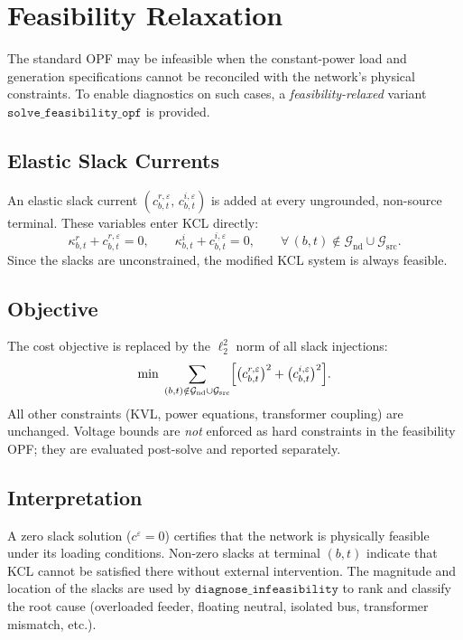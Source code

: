 \documentclass[11pt,a4paper]{article}
\newcommand{\mc}[1]{\mathcal{#1}}
\begin{document}
\section{Feasibility Relaxation}
\label{sec:feasibility}

The standard OPF may be infeasible when the constant-power load and generation
specifications cannot be reconciled with the network's physical constraints.  To
enable diagnostics on such cases, a \emph{feasibility-relaxed} variant
$\texttt{solve\_feasibility\_opf}$ is provided.

\subsection{Elastic Slack Currents}

An elastic slack current $(c^{r,\varepsilon}_{b,t},\, c^{i,\varepsilon}_{b,t})$
is added at every ungrounded, non-source terminal.  These variables enter KCL
directly:
%
\begin{equation}
  \kappa^r_{b,t} + c^{r,\varepsilon}_{b,t} = 0,\qquad
  \kappa^i_{b,t} + c^{i,\varepsilon}_{b,t} = 0,
  \qquad \forall\,(b,t)\notin\mc{G}_\text{nd}\cup\mc{G}_\text{src}.
\end{equation}
%
Since the slacks are unconstrained, the modified KCL system is always feasible.

\subsection{Objective}

The cost objective is replaced by the $\ell_2^2$ norm of all slack injections:
%
\begin{equation}
  \min\;\sum_{(b,t)\notin\mc{G}_\text{nd}\cup\mc{G}_\text{src}}
    \Bigl[
      \bigl(c^{r,\varepsilon}_{b,t}\bigr)^2
      + \bigl(c^{i,\varepsilon}_{b,t}\bigr)^2
    \Bigr].
\end{equation}
%
All other constraints (KVL, power equations, transformer coupling) are
unchanged.  Voltage bounds are \emph{not} enforced as hard constraints in the
feasibility OPF; they are evaluated post-solve and reported separately.

\subsection{Interpretation}

A zero slack solution ($c^\varepsilon = 0$) certifies that the network is
physically feasible under its loading conditions.  Non-zero slacks at terminal
$(b,t)$ indicate that KCL cannot be satisfied there without external
intervention.  The magnitude and location of the slacks are used by
$\texttt{diagnose\_infeasibility}$ to rank and classify the root cause
(overloaded feeder, floating neutral, isolated bus, transformer mismatch, etc.).
\end{document}
